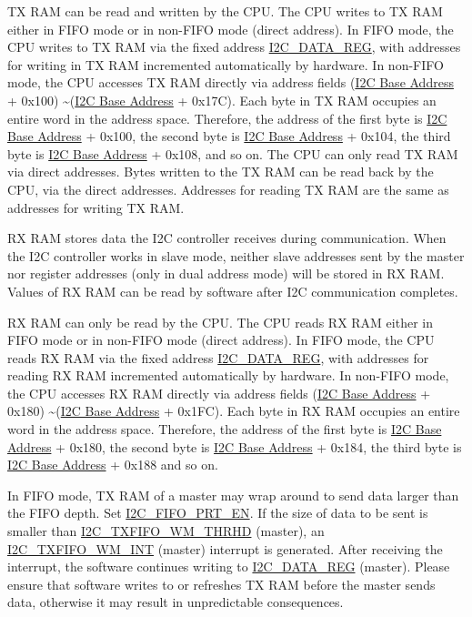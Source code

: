 \documentclass[main\_\_EN.tex]{subfiles}
\begin{document}
TX RAM can be read and written by the CPU. The CPU writes to TX RAM either in FIFO mode or in non-FIFO mode (direct address). In FIFO mode, the CPU writes to TX RAM via the fixed address \hyperref[regdesc:I2CDATAREG]{I2C\_DATA\_REG}, with addresses for writing in TX RAM incremented automatically by hardware. In non-FIFO mode, the CPU accesses TX RAM directly via address fields (\hyperref[tab:sysmem-base-address]{I2C Base Address} + 0x100) \textasciitilde (\hyperref[tab:sysmem-base-address]{I2C Base Address} + 0x17C). Each byte in TX RAM occupies an entire word in the address space. Therefore, the address of the first byte is \hyperref[tab:sysmem-base-address]{I2C Base Address} + 0x100, the second byte is \hyperref[tab:sysmem-base-address]{I2C Base Address} + 0x104, the third byte is \hyperref[tab:sysmem-base-address]{I2C Base Address} + 0x108, and so on. The CPU can only read TX RAM via direct addresses. Bytes written to the TX RAM can be read back by the CPU, via the direct addresses. Addresses for reading TX RAM are the same as addresses for writing TX RAM.

RX RAM stores data the I2C controller receives during communication. When the I2C controller works in slave mode, neither slave addresses sent by the master nor register addresses (only in dual address mode) will be stored in RX RAM. Values of RX RAM can be read by software after I2C communication completes.

RX RAM can only be read by the CPU. The CPU reads RX RAM either in FIFO mode or in non-FIFO mode (direct address). In FIFO mode, the CPU reads RX RAM via the fixed address \hyperref[regdesc:I2CDATAREG]{I2C\_DATA\_REG}, with addresses for reading RX RAM incremented automatically by hardware. In non-FIFO mode, the CPU accesses RX RAM directly via address fields (\hyperref[tab:sysmem-base-address]{I2C Base Address} + 0x180) \textasciitilde (\hyperref[tab:sysmem-base-address]{I2C Base Address} + 0x1FC). Each byte in RX RAM occupies an entire word in the address space. Therefore, the address of the first byte is \hyperref[tab:sysmem-base-address]{I2C Base Address} + 0x180, the second byte is \hyperref[tab:sysmem-base-address]{I2C Base Address} + 0x184, the third byte is \hyperref[tab:sysmem-base-address]{I2C Base Address} + 0x188 and so on.

In FIFO mode, TX RAM of a master may wrap around to send data larger than the FIFO depth. Set \hyperref[fielddesc:I2CFIFOPRTEN]{I2C\_FIFO\_PRT\_EN}. If the size of data to be sent is smaller than \hyperref[fielddesc:I2CTXFIFOWMTHRHD]{I2C\_TXFIFO\_WM\_THRHD} (master), an \hyperref[int:i2c-txfifo-wm]{I2C\_TXFIFO\_WM\_INT} (master) interrupt is generated. After receiving the interrupt, the software continues writing to \hyperref[regdesc:I2CDATAREG]{I2C\_DATA\_REG} (master). Please ensure that software writes to or refreshes TX RAM before the master sends data, otherwise it may result in unpredictable consequences.
\end{document}
